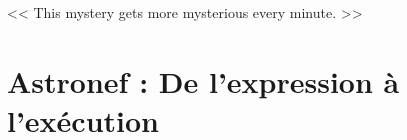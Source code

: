 \begin{savequote}[6cm]
<< This mystery gets more mysterious every minute. >>
\end{savequote}

\chapter{Astronef : De l'expression à l'exécution}





